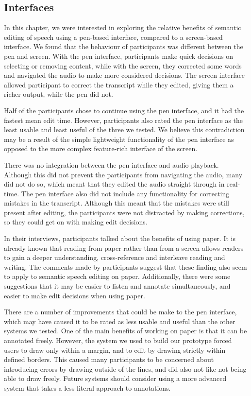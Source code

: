 \subsection{Interfaces}

In this chapter, we were interested in exploring the relative benefits of semantic editing of speech using a pen-based 
interface, compared to a screen-based interface.
We found that the behaviour of participants was different between the pen and screen. With the pen interface,
participants make
quick decisions on selecting or removing content, while with the screen, they corrected some words and navigated the
audio to make more considered decisions. The screen interface allowed participant to correct the transcript while they
edited, giving them a richer output, while the pen did not.

Half of the participants chose to continue using the pen interface, and it had the fastest mean edit time. However,
participants also rated the pen interface as the least usable and least useful of the three we tested. We believe this
contradiction may be a result of the simple lightweight functionality of the pen interface as opposed to the
more complex feature-rich interface of the screen.

There was no integration between the pen interface and audio playback. Although this did not prevent the participants
from navigating the audio, many did not do so, which meant that they edited the audio straight through in real-time. 
The pen interface also did not include any functionality for correcting mistakes in the transcript. Although this meant
that the mistakes were still present after editing, the participants were not distracted by making corrections, so they
could get on with making edit decisions.

In their interviews, participants talked about the benefits of using paper. It is already known that reading from paper
rather than from a screen allows readers to gain a deeper understanding, cross-reference and interleave reading and
writing.  The comments made by participants suggest that these finding also seem to apply to semantic speech editing on
paper. Additionally, there were some suggestions that it may be easier to listen and annotate simultaneously, and
easier to make edit decisions when using paper.

There are a number of improvements that could be make to the pen interface, which may have caused it to be rated as
less usable and useful than the other systems we tested. One of the main benefits of working on
paper is that it can be annotated freely. However, the system we used to build our prototype forced users to draw only
within a margin, and to edit by drawing strictly within defined borders. This caused many participants to be concerned
about introducing errors by drawing outside of the lines, and did also not like not being able to draw freely.
Future systems should consider using a more advanced system that takes a less literal approach to annotations.

